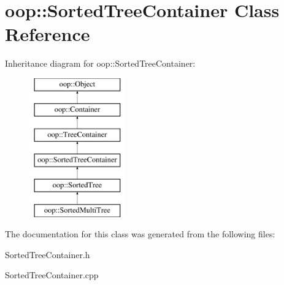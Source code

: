 \hypertarget{classoop_1_1SortedTreeContainer}{\section{oop\-:\-:\-Sorted\-Tree\-Container \-Class \-Reference}
\label{classoop_1_1SortedTreeContainer}
}
\-Inheritance diagram for oop\-:\-:\-Sorted\-Tree\-Container\-:\begin{figure}[H]
\begin{center}
\leavevmode
\includegraphics[height=6.000000cm]{classoop_1_1SortedTreeContainer}
\end{center}
\end{figure}


\-The documentation for this class was generated from the following files\-:\begin{DoxyCompactItemize}
\item 
\-Sorted\-Tree\-Container.\-h\item 
\-Sorted\-Tree\-Container.\-cpp\end{DoxyCompactItemize}
